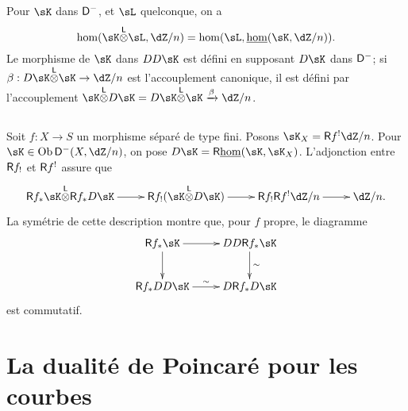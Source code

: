 Pour $\sK$ dans $\mathsf{D}^-$, et $\sL$ quelconque, on a 
\[
  \hom(\sK\lotimes \sL,\dZ/n) = \hom(\sL,\underline\hom(\sK,\dZ/n)) \text{.}
\]
Le morphisme de $\sK$ dans $DD\sK$ est d\'efini en supposant $D\sK$ dans 
$\mathsf{D}^-$; si $\beta:D\sK\lotimes\sK\to \dZ/n$ est l'accouplement canonique, il 
est d\'efini par l'accouplement 
$\sK\lotimes D\sK=D\sK\lotimes \sK \xrightarrow\beta \dZ/n$. 





\subsection{}\label{V:1-2}

Soit $f:X\to S$ un morphisme s\'epar\'e de type fini. Posons 
$\sK_X=\R f^!\dZ/n$. Pour $\sK\in \ob\D^-(X,\dZ/n)$, on pose 
$D\sK = \R\underline\hom(\sK,\sK_X)$. L'adjonction entre $\mathsf{R} f_!$ et $\mathsf{R} f^!$ 
assure que 
\[\xymatrix{
  \R f_\ast \sK\lotimes \R f_\ast D\sK \ar[r] 
    & \R f_! (\sK\lotimes D\sK) \ar[r] 
    & \R f_! \R f^! \dZ/n \ar[r] 
    & \dZ/n \text{.}
}\]
La sym\'etrie de cette description montre que, pour $f$ propre, le diagramme 
\begin{equation}\label{V:eq:1-2-1}
\xymatrix{
  \R f_\ast \sK \ar[r] \ar[d] 
    & D D \R f_\ast \sK \ar[d]^-\sim \\
  \R f_\ast D D \sK \ar[r]^\sim 
    & D\R f_\ast D\sK
}
\end{equation}
est commutatif. 


\section{La dualité de Poincaré pour les courbes}\label{V:2}
